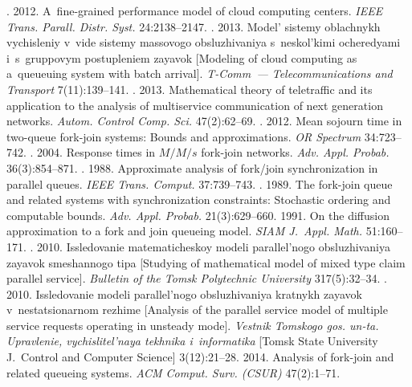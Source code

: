 \begin{multicols}{2}
{{\begin{thebibliography}{99}
. 2012. 
A~fine-grained performance model of cloud computing centers. 
\textit{IEEE Trans. Parall. Distr. Syst.} 24:2138--2147.
. 2013. 
Model' sistemy oblachnykh vychisleniy v~vide sistemy massovogo obsluzhivaniya 
s~neskol'kimi ocheredyami i~s~gruppovym postupleniem zayavok [Modeling of cloud 
computing as a~queueuing system with batch arrival]. 
\textit{T-Comm~--- Telecommunications and Transport} 7(11):139--141.
. 
2013. Mathematical theory of teletraffic and its application to the analysis 
of multiservice communication of next generation networks. 
\textit{Autom. Control Comp. Sci.} 47(2):62--69.
. 2012. Mean sojourn time in two-queue fork-join systems: 
Bounds and approximations. \textit{OR Spectrum} 34:723--742.
. 2004. Response times in $M/M/s$ fork-join networks. 
\textit{Adv. Appl. Probab.} 36(3):854--871.
. 1988. 
Approximate analysis of fork/join synchronization in parallel queues. 
\textit{IEEE Trans. Comput.} 37:739--743.
. 1989. 
The fork-join queue and related systems with synchronization constraints: 
Stochastic ordering and computable bounds. 
\textit{Adv. Appl. Probab.} 21(3):629--660.
 1991. On the diffusion approximation to a fork and join 
queueing model. \textit{SIAM J.~Appl. Math.} 51:160--171.
. 2010. Issledovanie
 matematicheskoy modeli parallel'nogo obsluzhivaniya zayavok smeshannogo tipa 
 [Studying of mathematical model of mixed type claim parallel service]. 
\textit{Bulletin of the Tomsk Polytechnic University} 317(5):32--34.
. 2010. Issledovanie modeli 
parallel'nogo obsluzhivaniya kratnykh zayavok v~nestatsionarnom rezhime [Analysis of 
the parallel service model of multiple service requests operating in unsteady mode]. 
\textit{Vestnik Tomskogo gos. un-ta. Upravlenie, vychislitel'naya 
tekhnika i~informatika} [Tomsk State University J.~Control and Computer Science] 
3(12):21--28.
 2014. Analysis of fork-join and related queueing systems. 
\textit{ACM Comput. Surv. (CSUR)} 47(2):1--71.
 
\end{thebibliography}

 }
 }

\end{multicols}

